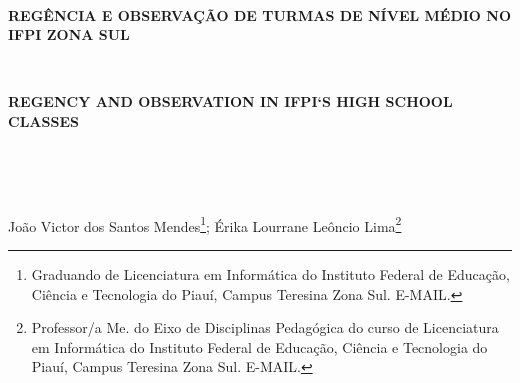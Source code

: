 \documentclass[
    article, 
    12pt, 
    oneside, 
    a4paper, 
    english, 
    brazil
    ]{abntex2}
\begin{document}

    \

    \begin{center}
        \textbf{REGÊNCIA E OBSERVAÇÃO DE TURMAS DE NÍVEL MÉDIO NO IFPI ZONA SUL}

        \
  
        \textbf{REGENCY AND OBSERVATION IN IFPI`S HIGH SCHOOL CLASSES}

        \


        \

        João Victor dos Santos Mendes\footnote{Graduando de Licenciatura em Informática do Instituto Federal de Educação, Ciência e Tecnologia do Piauí, Campus Teresina Zona Sul. E-MAIL.}; Érika Lourrane Leôncio Lima\footnote{Professor/a Me. do Eixo de Disciplinas Pedagógica do curso de Licenciatura em Informática do Instituto Federal de Educação, Ciência e Tecnologia do Piauí, Campus Teresina Zona Sul. E-MAIL.}
    \end{center}

    
    
    
    
\end{document}

